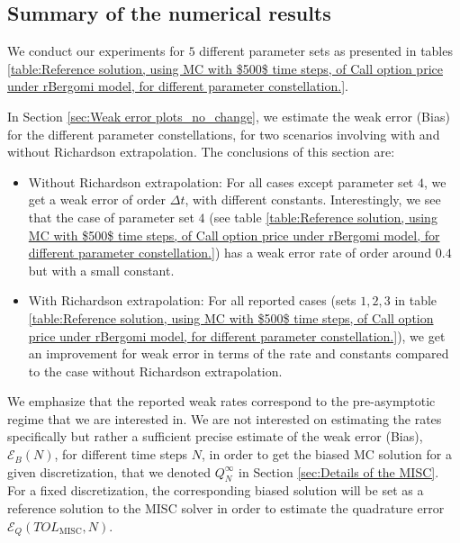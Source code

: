 

\subsection{Summary of the numerical results}

We conduct our experiments for $5$ different parameter  sets as presented in tables \ref{table:Reference solution, using MC with $500$ time steps, of Call option price under rBergomi model, for different parameter constellation.}. 

In Section \ref{sec:Weak error plots_no_change}, we estimate the weak error  (Bias) for the different parameter constellations, for two scenarios involving with and without  Richardson extrapolation. The conclusions of this section are: 
\begin{itemize}
	\item Without Richardson extrapolation: For all cases except parameter set $4$, we get a weak error of order $\Delta t$, with different  constants. Interestingly, we see that the case of parameter set $4$ (see table \ref{table:Reference solution, using MC with $500$ time steps, of Call option price under rBergomi model, for different parameter constellation.}) has a weak error rate of order around $0.4$ but with a small constant. 
	
		\item With Richardson extrapolation: For all reported cases (sets  $1,2,3$ in table \ref{table:Reference solution, using MC with $500$ time steps, of Call option price under rBergomi model, for different parameter constellation.}), we get an improvement for weak error in terms of the rate and constants compared to the case without Richardson extrapolation.
\end{itemize}

\begin{remark}
We emphasize that the reported weak rates correspond to the pre-asymptotic regime that we are interested in. We are not interested on estimating the rates specifically but rather a sufficient precise estimate of the weak error (Bias), $\mathcal{E}_B(N)$, for different time steps $N$, in order to get the biased MC  solution for a given discretization, that we denoted $Q_N^\infty$ in Section \ref{sec:Details of the MISC}.  For a fixed discretization, the corresponding biased solution will be set as a reference solution to the MISC solver in order to estimate the quadrature error $\mathcal{E}_Q(TOL_{\text{MISC}},N)$.	
\end{remark}

